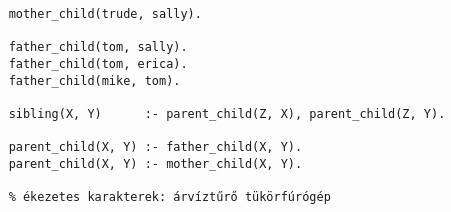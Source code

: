 \documentclass[a4paper]{article}
\begin{document}
    \begin{verbatim}
    mother_child(trude, sally).

    father_child(tom, sally).
    father_child(tom, erica).
    father_child(mike, tom).

    sibling(X, Y)      :- parent_child(Z, X), parent_child(Z, Y).

    parent_child(X, Y) :- father_child(X, Y).
    parent_child(X, Y) :- mother_child(X, Y).
    
    % ékezetes karakterek: árvíztűrő tükörfúrógép
    \end{verbatim}
\end{document}
